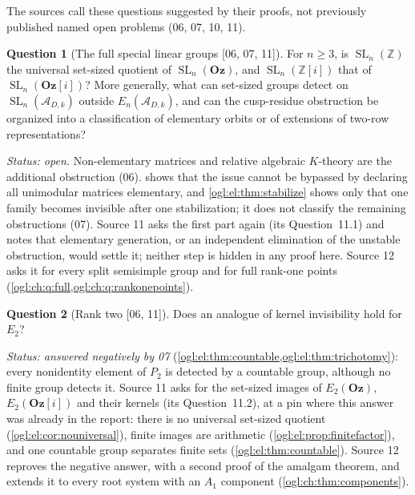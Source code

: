 \documentclass[11pt,oneside]{article}
\numberwithin{equation}{section}
\theoremstyle{definition}
\newtheorem{question}[question]{Question}
\theoremstyle{remark}
\newcommand{\Oz}{\mathbf{Oz}}
\newcommand{\GOz}{\mathbf{Oz}[i]}
\newcommand{\Z}{\mathbb Z}
\newcommand{\A}{\mathcal A}
\newcommand{\SL}{\operatorname{SL}}
\newcommand{\src}[1]{\textup{\textsf{\small[#1]}}}
\begin{document}
The sources call these questions suggested by their proofs, not previously
published named open problems (06, 07, 10, 11).

\begin{question}[The full special linear groups \src{06, 07, 11}]\label{ogl:q:sln}
For $n\ge3$, is $\SL_n(\Z)$ the universal set-sized quotient of $\SL_n(\Oz)$, and
$\SL_n(\Z[i])$ that of $\SL_n(\GOz)$? More generally, what can set-sized groups
detect on $\SL_n(\A_{D,k})$ outside $E_n(\A_{D,k})$, and can the cusp-residue
obstruction be organized into a classification of elementary orbits or of
extensions of two-row representations?
\end{question}
\emph{Status: open.} Non-elementary matrices and relative algebraic $K$-theory
are the additional obstruction (06).  shows that the
issue cannot be bypassed by declaring all unimodular matrices elementary, and
\cref{ogl:el:thm:stabilize} shows only that one family becomes invisible after
one stabilization; it does not classify the remaining obstructions (07). Source
11 asks the first part again (its Question~11.1) and notes that elementary
generation, or an independent elimination of the unstable obstruction, would
settle it; neither step is hidden in any proof here. Source 12 asks it for
every split semisimple group and for full rank-one points
(\cref{ogl:ch:q:full,ogl:ch:q:rankonepoints}).

\begin{question}[Rank two \src{06, 11}]\label{ogl:q:ranktwo}
Does an analogue of kernel invisibility hold for $E_2$?
\end{question}
\emph{Status: answered negatively by 07} (\cref{ogl:el:thm:countable,ogl:el:thm:trichotomy}):
every nonidentity element of $P_2$ is detected by a countable group, although no
finite group detects it. Source 11 asks for the set-sized images of $E_2(\Oz)$,
$E_2(\GOz)$ and their kernels (its Question~11.2), at a pin where this answer
was already in the report: there is no universal set-sized quotient
(\cref{ogl:el:cor:nouniversal}), finite images are arithmetic
(\cref{ogl:el:prop:finitefactor}), and one countable group separates finite
sets (\cref{ogl:el:thm:countable}). Source 12 reproves the negative answer, with
a second proof of the amalgam theorem, and extends it to every root system with
an $A_1$ component (\cref{ogl:ch:thm:components}).
\end{document}
